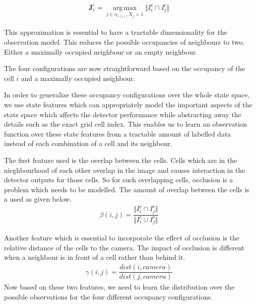 \documentclass[10pt,twocolumn,letterpaper]{article}
\begin{document}
\begin{align}
 \textbf{J}_{i}^{c} = \operatorname*{arg\,max}_{j\in n_{c(i)},X_{j}=1} \Vert I_{i}^{c}\cap I_{j}^{c} \Vert  
\end{align}

This approximation is essential to have a tractable dimensionality for the observation model. 
This reduces the possible occupancies of neighbours to two. Either a maximally occupied neighbour or an empty neighbour. 

The four configurations are now straightforward based on the occupancy of the cell $i$ and a maximally occupied neighbour.

In order to generalize these occupancy configurations over the whole state space, we use state features which can appropriately  
model the important aspects of the state space which affects the detector performance while abstracting away the details such as the exact grid cell index. This enables us to learn an observation function over these state features from a tractable amount of labelled data instead of each combination of a cell and its neighbour.

The first feature used is the overlap between the cells. Cells which are in the nieghbourhood of each other overlap in the image and causes interaction in the detector outputs for those cells. So for such overlapping cells, occlusion is a problem which needs to be modelled. The amount of overlap between the cells is a used as given below. 
\begin{align}
\beta(i,j) = \dfrac{\Vert I_{i}^{c} \cap I_{j}^{c} \Vert}{\Vert I_{i}^{c} \cup I_{j}^{c} \Vert}
\end{align}

Another feature which is essential to incorporate the effect of occlusion is the relative distance of the cells to the camera. 
The impact of occlusion is different when a neighbour is in front of a cell rather than behind it. 
\begin{align}
\gamma(i,j) = \dfrac{dist(i,camera)}{dist(j,camera)}
\end{align}
Now based on these two features, we need to learn the distribution over the possible observations for the four different occupancy configurations.  
\end{document}
